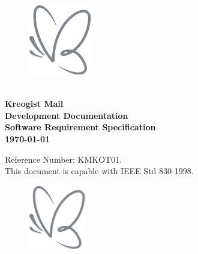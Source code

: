 \documentclass[11pt,a4paper]{article}
\newcommand{\titlesize}{\fontsize{70pt}{\baselineskip}\selectfont}
\begin{document}
    \newcommand{\tabincell}[2]{\begin{tabular}{@{}#1@{}}#2\end{tabular}}
    \begin{titlepage}
        \begin{figure}[h!]
            \hfill\includegraphics{Kreogist.png}
        \end{figure}
        \begin{spacing}{2.0}
            \textcolor[rgb]{0.49,0.52,0.55}{\titlesize \\ \textbf{Kreogist Mail\\ Development Documentation\\}}
            \textcolor[rgb]{0.49,0.52,0.55}{\textbf{Software Requirement Specification}\\}
            \textcolor[rgb]{0.49,0.52,0.55}{\textbf{\today}\\}
        \end{spacing}
        \vfill
        \textcolor[rgb]{0.49,0.52,0.55}{
            \begin{flushright}
                Reference Number: KMKOT01.\\
                This document is capable with IEEE Std 830-1998.
            \end{flushright}
        }
        \restoregeometry
    \end{titlepage}
    \thispagestyle{empty}
    \begin{figure}[h!]
        \includegraphics[width=2.5cm]{Kreogist.png}
    \end{figure}
    \vspace{4.5cm}
\end{document}
